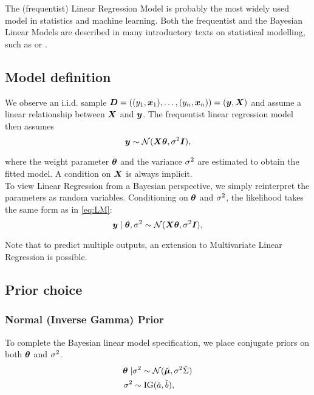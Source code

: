 The (frequentist) Linear Regression Model is probably the most widely used model in statistics and machine learning.
Both the frequentist and the Bayesian Linear Models are described in many introductory texts on statistical modelling, such as \citet{fahrmeir_regression_2021} or \citet{gelman_bayesian_2013}.


\subsection{Model definition}

We observe an i.i.d. sample $\bm{D} = ((y_1, \bm{x}_1), \dots, (y_n, \bm{x}_n))= (\bm{y}, \bm{X})$ and assume a linear relationship between $\bm{X}$ and $\bm{y}$.
The frequentist linear regression model then assumes
\begin{equation} \label{eq:LM}
    \bm{y} \sim \mathcal{N}(\bm{X} \bm{\theta}, \sigma^2 \bm{I}),
\end{equation}

where the weight parameter $\bm{\theta}$ and the variance $\sigma^2$ are estimated to obtain the fitted model.
A condition on $\bm{X}$ is always implicit.\\

To view Linear Regression from a Bayesian perspective, we simply reinterpret the parameters as random variables.
Conditioning on $\bm{\theta}$ and $\sigma^2$, the likelihood takes the same form as in \eqref{eq:LM}:
\begin{equation} \label{eq:BLM}
    \bm{y} \mid \bm{\theta}, \sigma^2 \sim \mathcal{N}(\bm{X} \bm{\theta}, \sigma^2 \bm{I}), 
\end{equation}

Note that to predict multiple outputs, an extension to Multivariate Linear Regression is possible.

\subsection{Prior choice}
\subsubsection*{Normal (Inverse Gamma) Prior}

To complete the Bayesian linear model specification, we place conjugate priors on both $\bm{\theta}$ and $\sigma^2$.
\begin{equation} \label{eq:NIGprior}
    \begin{aligned}
        \bm{\theta} \mid &\sigma^2 \sim  \mathcal{N}(\breve{\bm{\mu}}, \sigma^2 \breve{\Sigma}) \\
        \sigma^2 &\sim \text{IG}(\breve{a}, \breve{b}),
    \end{aligned}
\end{equation}

